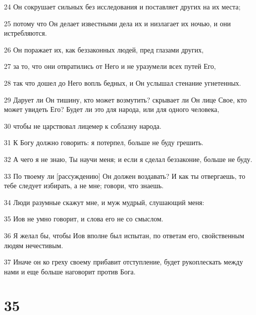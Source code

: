 \par 24 Он сокрушает сильных без исследования и поставляет других на их места;
\par 25 потому что Он делает известными дела их и низлагает их ночью, и они истребляются.
\par 26 Он поражает их, как беззаконных людей, пред глазами других,
\par 27 за то, что они отвратились от Него и не уразумели всех путей Его,
\par 28 так что дошел до Него вопль бедных, и Он услышал стенание угнетенных.
\par 29 Дарует ли Он тишину, кто может возмутить? скрывает ли Он лице Свое, кто может увидеть Его? Будет ли это для народа, или для одного человека,
\par 30 чтобы не царствовал лицемер к соблазну народа.
\par 31 К Богу должно говорить: я потерпел, больше не буду грешить.
\par 32 А чего я не знаю, Ты научи меня; и если я сделал беззаконие, больше не буду.
\par 33 По твоему ли [рассуждению] Он должен воздавать? И как ты отвергаешь, то тебе следует избирать, а не мне; говори, что знаешь.
\par 34 Люди разумные скажут мне, и муж мудрый, слушающий меня:
\par 35 Иов не умно говорит, и слова его не со смыслом.
\par 36 Я желал бы, чтобы Иов вполне был испытан, по ответам его, свойственным людям нечестивым.
\par 37 Иначе он ко греху своему прибавит отступление, будет рукоплескать между нами и еще больше наговорит против Бога.

\chapter{35}

